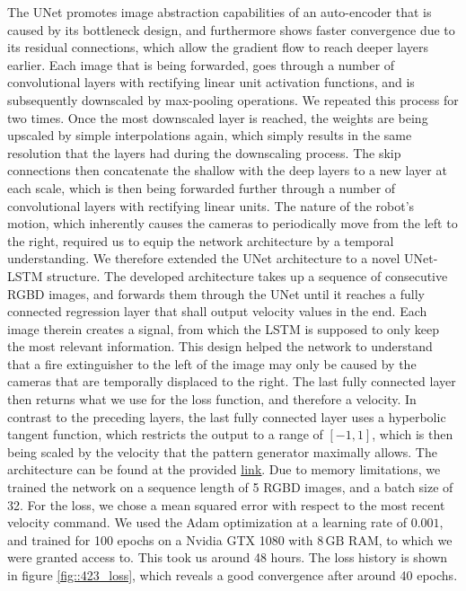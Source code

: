 The UNet promotes image abstraction capabilities of an auto-encoder that is caused by its bottleneck design, and furthermore shows faster convergence due to its residual connections, which allow the gradient flow to reach deeper layers earlier. Each image that is being forwarded, goes through a number of convolutional layers with rectifying linear unit activation functions, and is subsequently downscaled by max-pooling operations. We repeated this process for two times. Once the most downscaled layer is reached, the weights are being upscaled by simple interpolations again, which simply results in the same resolution that the layers had during the downscaling process. The skip connections then concatenate the shallow with the deep layers to a new layer at each scale, which is then being forwarded further through a number of convolutional layers with rectifying linear units. The nature of the robot's motion, which inherently causes the cameras to periodically move from the left to the right, required us to equip the network architecture by a temporal understanding. We therefore extended the UNet architecture to a novel UNet-LSTM structure. The developed architecture takes up a sequence of consecutive RGBD images, and forwards them through the UNet until it reaches a fully connected regression layer that shall output velocity values in the end. Each image therein creates a signal, from which the LSTM is supposed to only keep the most relevant information. This design helped the network to understand that a fire extinguisher to the left of the image may only be caused by the cameras that are temporally displaced to the right. The last fully connected layer then returns what we use for the loss function, and therefore a velocity. In contrast to the preceding layers, the last fully connected layer uses a hyperbolic tangent function, which restricts the output to a range of $[-1,1]$, which is then being scaled by the velocity that the pattern generator maximally allows. The architecture can be found at the provided \href{https://github.com/mhubii/nmpc_pattern_generator/blob/master/libs/learning/python/unet_model.py}{\underline{link}}. Due to memory limitations, we trained the network on a sequence length of 5 RGBD images, and a batch size of 32. For the loss, we chose a mean squared error with respect to the most recent velocity command. We used the Adam optimization \cite{kingma2014adam} at a learning rate of  $0.001$, and trained for 100 epochs on a Nvidia GTX 1080 with $8\,\text{GB}$ RAM, to which we were granted access to. This took us around 48 hours. The loss history is shown in figure \ref{fig::423_loss}, which reveals a good convergence after around 40 epochs.

